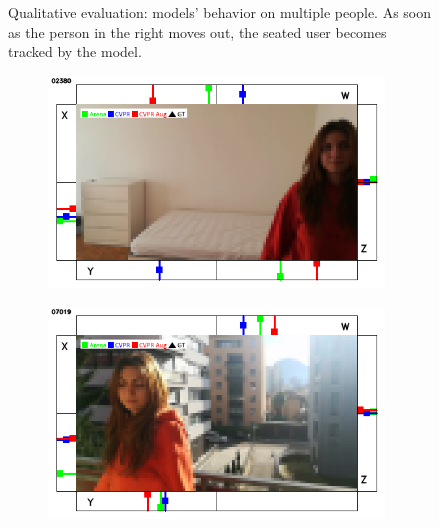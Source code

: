 \begin{figure}[H]
\begin{center}
\begin{subfigure}[h]{0.49\textwidth}
		\end{subfigure}
	\end{center}
	\vspace{-0.5cm}
	\caption[Qualitative evaluation: models' behavior on multiple people]{Qualitative evaluation: models' behavior on multiple people. As soon as the person in the right moves out, the seated user becomes tracked by the model.}
	\label{fig:ql-sim-double-change}
\end{figure}



\begin{figure}[H]
	\begin{center}
		\begin{subfigure}[h]{0.49\textwidth}
			\centering
			\includegraphics[width=0.98\textwidth]{"contents/images/qualitative-videos/W-bias-house01-2380"}
		\end{subfigure}
		\hfill
		\begin{subfigure}[h]{0.49\textwidth}
			\centering
			\includegraphics[width=0.98\textwidth]{"contents/images/qualitative-videos/W-bias-house01-7019"}

\end{subfigure}
\end{center}
\end{figure}
